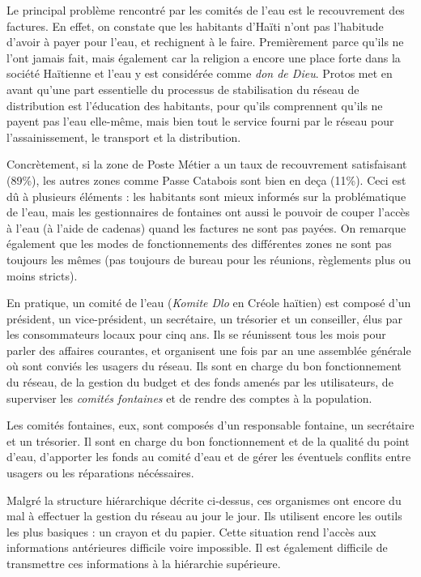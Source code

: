 \documentclass{eplmastersthesis_FR}
\begin{document}
    			Le principal problème rencontré par les comités de l'eau est le recouvrement des factures. En effet, on constate que les habitants d'Haïti n'ont pas l'habitude d'avoir à payer pour l'eau, et rechignent à le faire. Premièrement parce qu'ils ne l'ont jamais fait, mais également car la religion a encore une place forte dans la société Haïtienne et l'eau y est considérée comme \emph{don de Dieu}. Protos met en avant qu'une part essentielle du processus de stabilisation du réseau de distribution est l'éducation des habitants, pour qu'ils comprennent qu'ils ne payent pas l'eau elle-même, mais bien tout le service fourni par le réseau pour l'assainissement, le transport et la distribution.

    			Concrètement, si la zone de Poste Métier a un taux de recouvrement satisfaisant (89\%), les autres zones comme Passe Catabois sont bien en deça (11\%). Ceci est dû à plusieurs éléments : les habitants sont mieux informés sur la problématique de l'eau, mais les gestionnaires de fontaines ont aussi le pouvoir de couper l'accès à l'eau (à l'aide de cadenas) quand les factures ne sont pas payées. On remarque également que les modes de fonctionnements des différentes zones ne sont pas toujours les mêmes (pas toujours de bureau pour les réunions, règlements plus ou moins stricts).

    			En pratique, un comité de l'eau (\emph{Komite Dlo} en Créole haïtien) est composé d'un président, un vice-président, un secrétaire, un trésorier et un conseiller, élus par les consommateurs locaux pour cinq ans. Ils se réunissent tous les mois pour parler des affaires courantes, et organisent une fois par an une assemblée générale où sont conviés les usagers du réseau. Ils sont en charge du bon fonctionnement du réseau, de la gestion du budget et des fonds amenés par les utilisateurs, de superviser les \emph{comités fontaines} et de rendre des comptes à la population.

    			Les comités fontaines, eux, sont composés d'un responsable fontaine, un secrétaire et un trésorier. Il sont en charge du bon fonctionnement et de la qualité du point d'eau, d'apporter les fonds au comité d'eau et de gérer les éventuels conflits entre usagers ou les réparations nécéssaires.

    			Malgré la structure hiérarchique décrite ci-dessus, ces organismes ont encore du mal à effectuer la gestion du réseau au jour le jour. Ils utilisent encore les outils les plus basiques : un crayon et du papier. Cette situation rend l'accès aux informations antérieures difficile voire impossible. Il est également difficile de transmettre ces informations à la hiérarchie supérieure.
\end{document}
